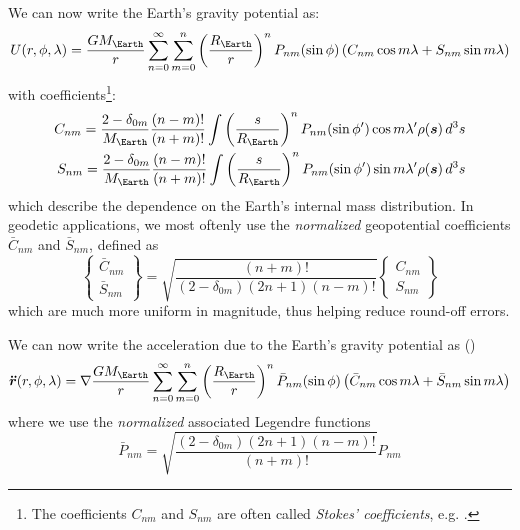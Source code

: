 We can now write the Earth's gravity potential as:
\begin{equation}\label{eq:mont310}
  U (r, \phi, \lambda ) = \frac{G M_{\Earth}}{r} \sum_{n=0}^{\infty} \sum_{m=0}^{n} 
      \left( \frac{R_{\Earth}}{r} \right) ^n P_{nm} (\sin \phi )
      \left( C_{nm} \cos {m\lambda} + S_{nm} \sin{m\lambda} \right)
\end{equation}
with coefficients\footnote{The coefficients $C_{nm}$ and $S_{nm}$ are often called 
\emph{Stokes' coefficients}, e.g. \cite{Barthelmes2018}.}:
\begin{equation}
  \begin{aligned}
    C_{nm} = \frac{2 - \delta _{0m}}{M_{\Earth}} \frac{(n-m)!}{(n+m)!} 
      \int \left({\frac{s}{R_{\Earth}}}\right)^n P_{nm} (\sin \phi ^\prime) \cos {m\lambda ^\prime} \rho (\bm{s}) \, d^3 s \\
    S_{nm} = \frac{2 - \delta _{0m}}{M_{\Earth}} \frac{(n-m)!}{(n+m)!} 
      \int \left({\frac{s}{R_{\Earth}}}\right)^n P_{nm} (\sin \phi ^\prime) \sin {m\lambda ^\prime} \rho (\bm{s}) \, d^3 s
  \end{aligned}
\end{equation}
which describe the dependence on the Earth's internal mass distribution. In geodetic 
applications, we most oftenly use the \emph{normalized} geopotential coefficients 
$\bar{C}_{nm}$ and ${\bar{S}}_{nm}$, defined as
\begin{equation}
  \begin{Bmatrix} \bar{C}_{nm} \\ \bar{S}_{nm} \end{Bmatrix} = 
  \sqrt{\frac{(n+m)!}{\left(2-\delta _{0m}\right) \left(2n+1\right) \left(n-m\right)!}}
  \begin{Bmatrix} C_{nm} \\ S_{nm} \end{Bmatrix}
\end{equation}
which are much more uniform in magnitude, thus helping reduce round-off errors.

We can now write the acceleration due to the Earth's gravity potential as 
(\cite{Montenbruck2000})
\begin{equation}\label{eq:mont315}
  \bm{\ddot{r}} (r, \phi, \lambda ) = \nabla \frac{GM_{\Earth}}{r} \sum_{n=0}^{\infty} \sum_{m=0}^{n} 
    \left(\frac{R_{\Earth}}{r}\right) ^n \bar{P}_{nm} (\sin \phi )
    \left( \bar{C}_{nm} \cos{m\lambda} + \bar{S}_{nm} \sin{m\lambda} \right)
\end{equation}
where we use the \emph{normalized} associated Legendre functions
\begin{equation}
  \bar{P}_{nm} = \sqrt{\frac{\left(2-\delta _{0m}\right) \left(2n+1\right) \left(n-m\right)!}{(n+m)!}} P_{nm}
\end{equation}

